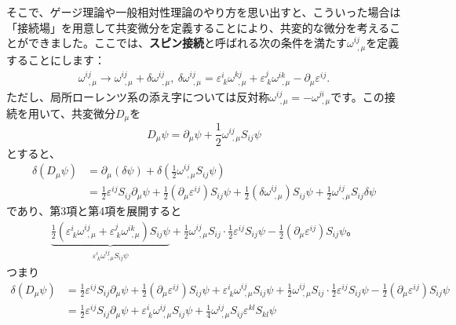 \documentclass[unicode,a4paper,11pt]{ltjsarticle}
\begin{document}
そこで、ゲージ理論や一般相対性理論のやり方を思い出すと、こういった場合は「接続場」を用意して共変微分を定義することにより、共変的な微分を考えることができました。ここでは、\textbf{スピン接続}と呼ばれる次の条件を満たす$\omega^{ij}_{\ \ ,\mu}$を定義することにします：
\begin{align}
   \omega^{ij}_{\ \ ,\mu}
   \rightarrow
   \omega^{ij}_{\ \ ,\mu}
   +
   \delta\omega^{ij}_{\ \ ,\mu}
   ,\
   \delta\omega^{ij}_{\ \ ,\mu}
   =
   \varepsilon^{i}_{\ k}\omega^{kj}_{\ \ ,\mu}
   +
   \varepsilon^{j}_{\ k}\omega^{ik}_{\ \ ,\mu}
   -
   \partial_{\mu}\varepsilon^{ij}
   .
\end{align}
ただし、局所ローレンツ系の添え字については反対称$\omega^{ij}_{\ \ ,\mu}=-\omega^{ji}_{\ \ ,\mu}$です。この接続を用いて、共変微分$D_{\mu}$を
\begin{equation}
   D_{\mu}\psi
   =
   \partial_{\mu}\psi
   +
   \frac{1}{2}\omega^{ij}_{\ \ ,\mu}S_{ij}\psi
\end{equation}
とすると、
\begin{align}
   \delta(D_{\mu}\psi)
    & =
   \partial_{\mu}(\delta\psi)
   +
   \delta
   \left(
   \frac{1}{2}\omega^{ij}_{\ \ ,\mu}S_{ij}\psi
   \right)
   \nonumber
   \\
    & =
   \frac{1}{2}\varepsilon^{ij}S_{ij}\partial_{\mu}\psi
   +
   \frac{1}{2}(\partial_{\mu}\varepsilon^{ij})S_{ij}\psi
   +
   \frac{1}{2}(\delta\omega^{ij}_{\ \ ,\mu})S_{ij}\psi
   +
   \frac{1}{2}\omega^{ij}_{\ \ ,\mu}S_{ij}\delta\psi
   \label{eqn:2_4}
\end{align}
であり、第3項と第4項を展開すると
\begin{align}
   \underbrace{
      \frac{1}{2}
      (
      \varepsilon^{i}_{\ k}\omega^{ij}_{\ \ ,\mu}
      +
      \varepsilon^{j}_{\ k}\omega^{ik}_{\ \ ,\mu}
      )
      S_{ij}\psi
   }_{
      \varepsilon^{i}_{\ k}\omega^{ij}_{\ \ ,\mu}
      S_{ij}\psi
   }
   +
   \frac{1}{2}\omega^{ij}_{\ \ ,\mu}S_{ij}
   \cdot
   \frac{1}{2}\varepsilon^{ij}S_{ij}\psi
   -
   \frac{1}{2}(\partial_{\mu}\varepsilon^{ij})S_{ij}\psi
   \mathrm{。}
   \label{eqn:2_5}
\end{align}
つまり
\begin{align}
   \delta(D_{\mu}\psi)
    & =
   \frac{1}{2}\varepsilon^{ij}S_{ij}\partial_{\mu}\psi
   +
   \frac{1}{2}(\partial_{\mu}\varepsilon^{ij})S_{ij}\psi
   +
   \varepsilon^{i}_{\ k}\omega^{ij}_{\ \ ,\mu}
   S_{ij}\psi
   +
   \frac{1}{2}\omega^{ij}_{\ \ ,\mu}S_{ij}
   \cdot
   \frac{1}{2}\varepsilon^{ij}S_{ij}\psi
   -
   \frac{1}{2}(\partial_{\mu}\varepsilon^{ij})S_{ij}\psi
   \nonumber
   \\
    & =
   \frac{1}{2}\varepsilon^{ij}S_{ij}\partial_{\mu}\psi
   +
   \varepsilon^{i}_{\ k}\omega^{ij}_{\ \ ,\mu}
   S_{ij}\psi
   +
   \frac{1}{4}\omega^{ij}_{\ \ ,\mu}S_{ij}\varepsilon^{kl}S_{kl}\psi
\end{align}
\end{document}
